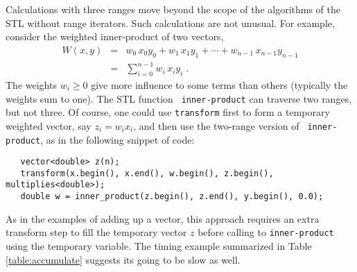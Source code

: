 \documentclass[12pt]{article}
\begin{document}
Calculations with three ranges move beyond the scope of the algorithms
of the STL without range iterators.  Such calculations are not
unusual.  For example, consider the weighted inner-product of two
vectors,
\begin{eqnarray*}
  W(x,y) 
  &=& w_0\, x_0 y_0 + w_1\, x_1 y_1 + \cdots + w_{n-1}\, x_{n-1}y_{n-1} \\
  &=& \sum_{i=0}^{n-1} w_i \, x_i y_i \;.
\end{eqnarray*} 
The weights $w_i \ge 0$ give more influence to some terms than others
(typically the weights sum to one).  The STL function {\tt
inner-product} can traverse two ranges, but not three.  Of course, one
could use {\tt transform} first to form a temporary weighted vector,
say $z_i = w_i x_i$, and then use the two-range version of {\tt
inner-product}, as in the following snippet of code:
\begin{verbatim}
   vector<double> z(n);
   transform(x.begin(), x.end(), w.begin(), z.begin(), multiplies<double>);
   double w = inner_product(z.begin(), z.end(), y.begin(), 0.0);
\end{verbatim}
As in the examples of adding up a vector, this approach requires an
extra transform step to fill the temporary vector $z$ before  calling
to {\tt inner-product} using the temporary variable.  The timing
example summarized in Table \ref{table:accumulate} suggests its going
to be slow as well.
\end{document}
